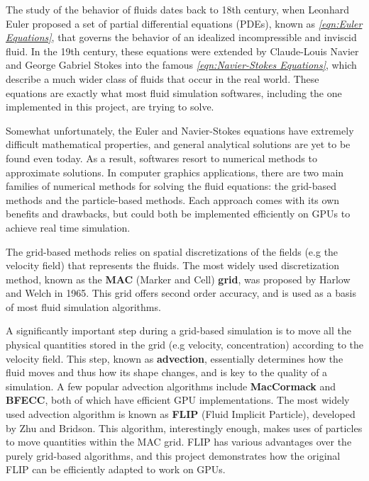 The study of the behavior of fluids dates back to 18th century, when Leonhard Euler proposed a set of partial differential equations (PDEs), known as \textit{\ref{eqn:Euler Equations}}, that governs the behavior of an idealized incompressible and inviscid fluid. In the 19th century, these equations were extended by Claude-Louis Navier and George Gabriel Stokes into the famous \textit{\ref{eqn:Navier-Stokes Equations}}, which describe a much wider class of fluids that occur in the real world. These equations are exactly what most fluid simulation softwares, including the one implemented in this project, are trying to solve. 

Somewhat unfortunately, the Euler and Navier-Stokes equations have extremely difficult mathematical properties, and general analytical solutions are yet to be found even today. As a result, softwares resort to numerical methods to approximate solutions. In computer graphics applications, there are two main families of numerical methods for solving the fluid equations: the grid-based methods and the particle-based methods. Each approach comes with its own benefits and drawbacks, but could both be implemented efficiently on GPUs to achieve real time simulation.

The grid-based methods relies on spatial discretizations of the fields (e.g the velocity field) that represents the fluids. The most widely used discretization method, known as the \textbf{MAC} (Marker and Cell) \textbf{grid}, was proposed by Harlow and Welch \cite{harlow1965numerical} in 1965. This grid offers second order accuracy, and is used as a basis of most fluid simulation algorithms. 

A significantly important step during a grid-based simulation is to move all the physical quantities stored in the grid (e.g velocity, concentration) according to the velocity field. This step, known as \textbf{advection}, essentially determines how the fluid moves and thus how its shape changes, and is key to the quality of a simulation. A few popular advection algorithms include \textbf{MacCormack}\cite{selle2008unconditionally} and \textbf{BFECC}\cite{kim2005flowfixer}, both of which have efficient GPU implementations\cite{chentanez2011real}\cite{xu2011interactive}. The most widely used advection algorithm is known as \textbf{FLIP} (Fluid Implicit Particle)\cite{zhu2005animating}, developed by Zhu and Bridson. This algorithm, interestingly enough, makes uses of particles to move quantities within the MAC grid. FLIP has various advantages over the purely grid-based algorithms, and this project demonstrates how the original FLIP can be efficiently adapted to work on GPUs.

